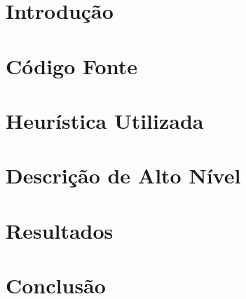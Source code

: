 \documentclass[11pt,a4paper]{article}
\date{12 de Junho de 2011}
\begin{document}
\capa

\section{Introdução} 


\section{Código Fonte}
\label{sec:fonte}


\section{Heurística Utilizada}
\label{sec:heuristica}


\section{Descrição de Alto Nível}
\label{sec:descricao}


\section{Resultados}
\label{sec:resultados}


\section{Conclusão}
\label{sec:conclusao}


\nocite{*}


\end{document}
